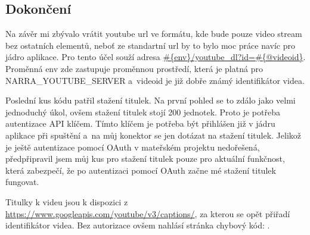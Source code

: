 \subsection{Dokončení}
\par Na závěr mi zbývalo vrátit youtube url ve formátu, kde bude pouze video stream bez ostatních elementů, neboť ze standartní url by to bylo moc práce navíc pro jádro aplikace. Pro tento účel souží adresa \url{#{env}/youtube_dl?id=#{@videoid}}. Proměnná env zde zastupuje proměnnou prostředí, která je platná pro NARRA\_YOUTUBE\_SERVER a~videoid je již dobře známý identifikátor videa.
\par Poslední kus kódu patřil stažení titulek. Na první pohled se to zdálo jako velmi jednoduchý úkol, ovšem stažení titulek stojí 200 jednotek. Proto je potřeba autentizace API klíčem. Tímto klíčem je potřeba být přihlášen již v jádru aplikace při spuštění a~na můj konektor se jen dotázat na stažení titulek. Jelikož je ještě autentizace pomocí OAuth v mateřském projektu nedořešená, předpřipravil jsem můj kus pro stažení titulek pouze pro aktuální funkčnost, která zabezpečí, že po autentizaci pomocí OAuth začne mé stažení titulek fungovat.
\par Titulky k videu jsou k dispozici z \url{https://www.googleapis.com/youtube/v3/captions/}, za kterou se opět přiřadí identifikátor videa. Bez autorizace ovšem nahlásí stránka chybový kód: .